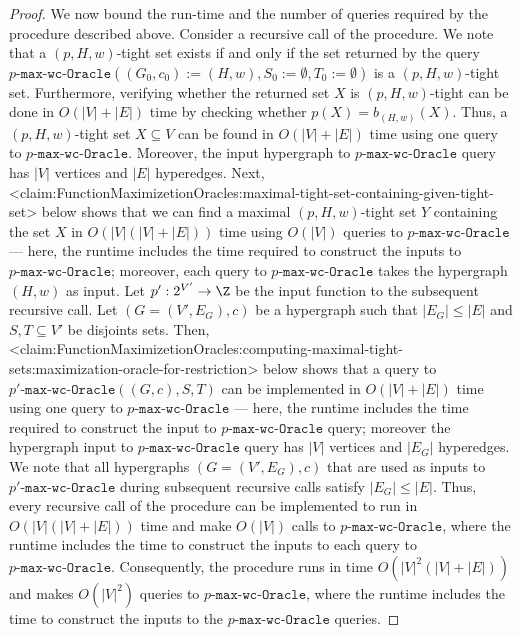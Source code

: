 \documentclass{article}
\def\Cref#1{<#1>}%
\newcommand{\functionMaximizationOracle}[1]{\ensuremath{{#1}\text{-}\mathtt{max}\text{-}\mathtt{wc}\text{-}\mathtt{Oracle}}\xspace}
\begin{document}
\begin{proof}
We now bound the run-time and the number of queries required by the procedure described above. Consider a recursive call of the procedure.
We note that a $(p, H, w)$-tight set exists if and only if the set returned by the query $\functionMaximizationOracle{p}((G_0, c_0):= (H, w), S_0:=\emptyset, T_0:=\emptyset)$ is a $(p, H, w)$-tight set.
Furthermore, verifying whether the returned set $X$ is $(p, H, w)$-tight can be done in $O(|V| + |E|)$ time by checking whether $p(X) = b_{(H,w)}(X)$.
Thus, a $(p, H, w)$-tight set $X\subseteq V$ can be found in  $O(|V| + |E|)$ time using one query to \functionMaximizationOracle{p}. Moreover, the input hypergraph to \functionMaximizationOracle{p} query has $|V|$ vertices and $|E|$ hyperedges.
Next, \Cref{claim:FunctionMaximizetionOracles:maximal-tight-set-containing-given-tight-set} below shows that we can find a maximal $(p, H, w)$-tight set $Y$ containing the set $X$ in $O(|V|(|V|+|E|))$ time using $O(|V|)$ queries to \functionMaximizationOracle{p} --- here, the runtime includes the time required to construct the inputs to \functionMaximizationOracle{p}; moreover, each query to \functionMaximizationOracle{p} takes the hypergraph $(H, w)$ as input.
Let $p':2^{V'}\rightarrow\Z$ be the input function to the subsequent recursive call. Let $(G = (V', E_G), c)$ be a hypergraph such that $|E_G| \leq |E|$ and $S, T \subseteq V'$ be disjoints sets. 
Then, \Cref{claim:FunctionMaximizetionOracles:computing-maximal-tight-sets:maximization-oracle-for-restriction} below shows that a query to $\functionMaximizationOracle{p'}((G, c), S, T)$ can be implemented in $O(|V| + |E|)$ time using one query to \functionMaximizationOracle{p} --- here, the runtime includes the time required to construct the input to \functionMaximizationOracle{p} query; moreover the hypergraph input to \functionMaximizationOracle{p} query has $|V|$ vertices and $|E_G|$ hyperedges. We note that all hypergraphs $(G = (V', E_G), c)$ that are used as inputs to \functionMaximizationOracle{p'} during subsequent recursive calls satisfy $|E_G| \leq |E|$.
Thus, every recursive call of the procedure can be implemented to run in $O(|V|(|V|+|E|))$ time and make $O(|V|)$ calls to \functionMaximizationOracle{p}, where the runtime includes the time to construct the inputs to each query to \functionMaximizationOracle{p}. Consequently, the procedure runs in time $O(|V|^2(|V|+|E|))$ and makes $O(|V|^2)$ queries to $\functionMaximizationOracle{p}$, where the runtime includes the time to construct the inputs to the \functionMaximizationOracle{p} queries.
\end{proof}
\end{document}
